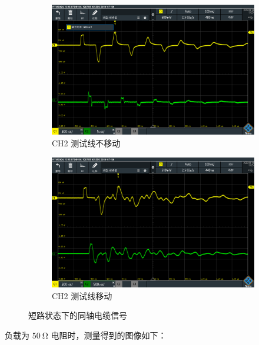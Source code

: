 \documentclass{customDoc}
\begin{document}
\begin{figure}[H]
\begin{subfigure}[b]{0.45\textwidth}
    \centering
    \includegraphics[width=\textwidth]{SCR02.PNG}
    \caption{CH2 测试线不移动}
    \label{fig:short_circuit_1}
\end{subfigure}
\hfill
\begin{subfigure}[b]{0.45\textwidth}
    \centering
    \includegraphics[width=\textwidth]{SCR03.PNG}
    \caption{CH2 测试线移动}
    \label{fig:short_circuit_2}
\end{subfigure}
\centering
\caption{短路状态下的同轴电缆信号}
\end{figure}

负载为 $\SI{50}{\ohm}$ 电阻时，测量得到的图像如下：
\end{document}
